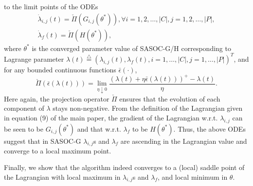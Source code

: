 \documentclass[11pt,letterpaper,english]{article}
\begin{document}
\begin{inparaenum}[\bfseries (I)]
to the limit points of the ODEs \[\begin{array}{l}
\dot{\lambda}_{i,j}(t) = \check\Pi \left ( G_{i, j}(\theta^*) \right ), \forall
i
=
1, 2, \dots, |C|, j = 1, 2, \dots, |P|,\\[1ex]
\dot{\lambda}_f(t) = \check\Pi \left ( H(\theta^*) \right ),
\end{array}\]
where $\theta^*$ is the converged parameter value of SASOC-G/H corresponding to
Lagrange parameter $\lambda(t) \stackrel{\triangle}{=} (\lambda_{i,j}(t),
\lambda_f(t), i=1,\ldots,|C|, j=1,\ldots,|P|)^T$, and for any bounded continuous
functions $\bar{\epsilon}(\cdot)$, \[\check\Pi(\bar{\epsilon}(\lambda(t))) =
\lim\limits_{\eta \downarrow 0} \dfrac{(\lambda(t) + \eta
\bar{\epsilon}(\lambda(t)))^+ - \lambda(t)}{\eta}.\] 
Here again, the projection
operator $\check\Pi$ ensures that the evolution of each component
of $\lambda$ stays non-negative. From the definition of the Lagrangian given in equation (9) of the  main paper, the gradient of the Lagrangian w.r.t. $\lambda_{i, j}$ can be seen to  be $G_{i,j}(\theta^*)$ and that w.r.t. $\lambda_f$ to be $H(\theta^*)$. Thus, the above ODEs suggest that in SASOC-G $\lambda_{i, j}$s and $\lambda_f$ are ascending in the Lagrangian value and converge to a local maximum point.\\
\item Finally, we show that the algorithm indeed converges to a (local) saddle point of the Lagrangian with local maximum in $\lambda_{i, j}$s and $\lambda_f$, and local minimum in $\theta$.
\end{inparaenum}
\end{document}
